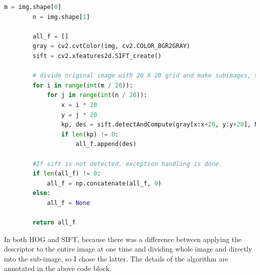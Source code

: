 \lstset{numbers = left, numbersep=5pt, breaklines=true}
\begin{lstlisting}[language=python, caption = {SIFT Feature extraction}]
        m = img.shape[0]
        n = img.shape[1]

        all_f = []
        gray = cv2.cvtColor(img, cv2.COLOR_BGR2GRAY)
        sift = cv2.xfeatures2d.SIFT_create()

        # divide original image with 20 X 20 grid and make subimages, so find SIFT descriptor by 20 X 20 sub images.
        for i in range(int(m / 20)):
            for j in range(int(n / 20)):
                x = i * 20
                y = j * 20
                kp, des = sift.detectAndCompute(gray[x:x+20, y:y+20], None)
                if len(kp) != 0:
                    all_f.append(des)
                    
        #If sift is not detected, exception handling is done.
        if len(all_f) != 0:
            all_f = np.concatenate(all_f, 0)
        else:
            all_f = None

        return all_f
\end{lstlisting}

In both HOG and SIFT, because there was a difference between applying the descriptor to the entire image at one time and dividing whole image and directly into the sub-image, so  I chose the latter. The details of the algorithm are annotated in the above code block.

